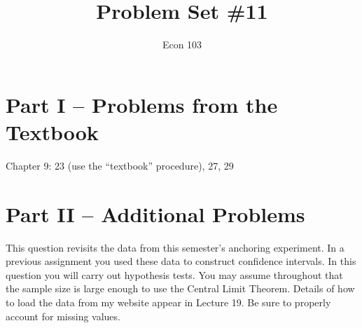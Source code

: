 \documentclass[addpoints,12pt]{exam}\usepackage[]{graphicx}\usepackage[]{color}
\title{Problem Set \#11}
\author{Econ 103}
\date{}
\begin{document}
\maketitle

\section*{Part I -- Problems from the Textbook}Chapter 9: 23 (use the ``textbook'' procedure), 27, 29


\section*{Part II -- Additional Problems}

\begin{questions}


\question This question revisits the data from this semester's anchoring experiment. In a previous assignment you used these data to construct confidence intervals. In this question you will carry out hypothesis tests. You may assume throughout that the sample size is large enough to use the Central Limit Theorem. Details of how to load the data from my website appear in Lecture 19. Be sure to properly account for missing values. 
\begin{parts}

\end{parts}
\end{questions}
\end{document}
